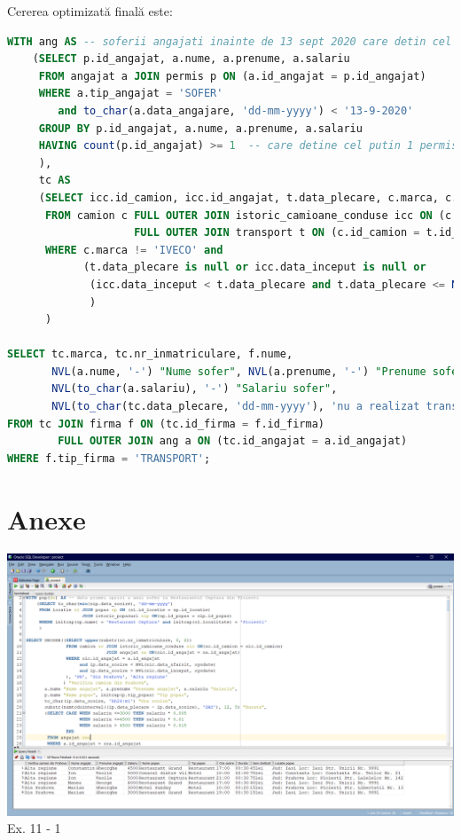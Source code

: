 \documentclass[12pt, a4paper]{article}
\begin{document}
Cererea optimizată finală este:

\begin{lstlisting}[language=SQL]
WITH ang AS -- soferii angajati inainte de 13 sept 2020 care detin cel mult 2 permise auto
    (SELECT p.id_angajat, a.nume, a.prenume, a.salariu
     FROM angajat a JOIN permis p ON (a.id_angajat = p.id_angajat)
     WHERE a.tip_angajat = 'SOFER'
        and to_char(a.data_angajare, 'dd-mm-yyyy') < '13-9-2020' 
     GROUP BY p.id_angajat, a.nume, a.prenume, a.salariu
     HAVING count(p.id_angajat) >= 1  -- care detine cel putin 1 permis  
     ),
     tc AS
     (SELECT icc.id_camion, icc.id_angajat, t.data_plecare, c.marca, c.nr_inmatriculare, c.id_firma
      FROM camion c FULL OUTER JOIN istoric_camioane_conduse icc ON (c.id_camion = icc.id_camion)
                    FULL OUTER JOIN transport t ON (c.id_camion = t.id_camion)
      WHERE c.marca != 'IVECO' and
            (t.data_plecare is null or icc.data_inceput is null or 
             (icc.data_inceput < t.data_plecare and t.data_plecare <= NVL(icc.data_sfarsit, sysdate))
             )
      )
    
SELECT tc.marca, tc.nr_inmatriculare, f.nume, 
       NVL(a.nume, '-') "Nume sofer", NVL(a.prenume, '-') "Prenume sofer", 
       NVL(to_char(a.salariu), '-') "Salariu sofer",
       NVL(to_char(tc.data_plecare, 'dd-mm-yyyy'), 'nu a realizat transporturi') "Data transport" 
FROM tc JOIN firma f ON (tc.id_firma = f.id_firma)
        FULL OUTER JOIN ang a ON (tc.id_angajat = a.id_angajat)
WHERE f.tip_firma = 'TRANSPORT';
\end{lstlisting}

\newpage
\section{Anexe}
\includegraphics[width=\textwidth]{ex11_1.png}
\label{Ex11 1}
\centering Ex. 11 - 1
\end{document}
